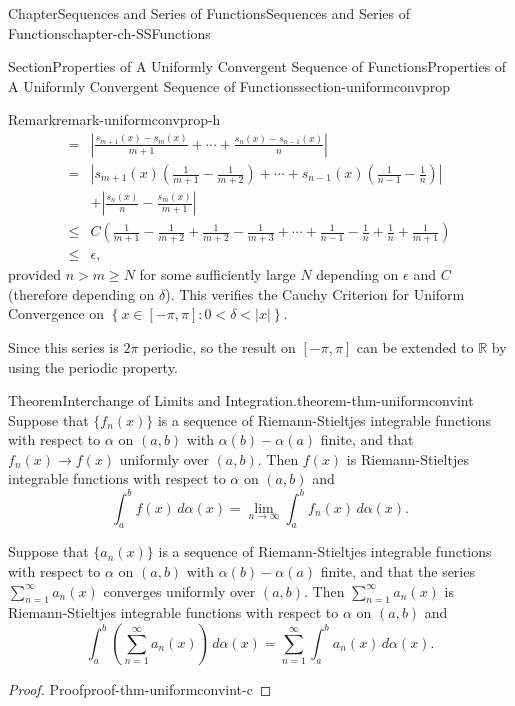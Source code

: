\documentclass[oneside,10pt,]{book}
\numberwithin{equation}{section}
\newcommand{\bbR}{\mathbb{R}}
\newcommand{\amp}{&}
\begin{document}
\begin{chapterptx}{Chapter}{Sequences and Series of Functions}{}{Sequences and Series of Functions}{}{}{chapter-ch-SSFunctions}
\begin{sectionptx}{Section}{Properties of A Uniformly Convergent Sequence of Functions}{}{Properties of A Uniformly Convergent Sequence of Functions}{}{}{section-uniformconvprop}
\begin{remark}{Remark}{}{remark-uniformconvprop-h}
\begin{align*}
=\amp \left| \frac{ s_{m+1}(x)-s_m(x)}{m+1}+ \cdots + \frac{ s_n(x)-s_{n-1}(x)}{n}\right| \\
=\amp \left| s_{m+1}(x)\left(\frac{1}{m+1}-\frac{1}{m+2}\right) 
+\cdots+ s_{n-1}(x)\left(\frac{1}{n-1}-\frac{1}{n}\right)\right| \\
\amp  + \left|\frac{s_n(x)}{n}-\frac{s_m(x)}{m+1}\right|\\
\le \amp C\left( \frac{1}{m+1}-\frac{1}{m+2} + \frac{1}{m+2}-\frac{1}{m+3} + \cdots +
\frac{1}{n-1}-\frac{1}{n} + \frac 1n +\frac {1}{m+1}\right)\\
\le \amp \epsilon\text{,}
\end{align*}
provided \(n > m\ge N\) for some sufficiently large \(N\) depending on \(\epsilon\) and \(C\) (therefore depending on \(\delta\)).  This verifies the Cauchy Criterion for Uniform Convergence on \(\left\{x\in [-\pi, \pi]: 0 < \delta < |x|\right\}\).%
\par
Since this series is \(2\pi\) periodic, so the result on \([-\pi, \pi]\) can be extended to \(\bbR\) by using the periodic property.%
\end{remark}
\begin{theorem}{Theorem}{Interchange of Limits and Integration.}{}{theorem-thm-uniformconvint}%
Suppose that \(\{f_n(x)\}\) is a sequence of Riemann-Stieltjes integrable functions with respect to \(\alpha\) on \((a, b)\) with \(\alpha(b)-\alpha(a)\) finite, and that \(f_n(x)\to f(x)\) uniformly over \((a, b)\). Then \(f(x)\) is Riemann-Stieltjes integrable functions with respect to \(\alpha\) on \((a, b)\) and%
\begin{equation}
\int_a^b f(x)\, d\alpha(x) =\lim_{n\to \infty} \int_a^b f_n(x)\, d\alpha(x).\label{men-limitint}
\end{equation}
%
\par
Suppose that  \(\{a_n(x)\}\) is a sequence of Riemann-Stieltjes integrable functions with respect to \(\alpha\) on \((a, b)\) with \(\alpha(b)-\alpha(a)\) finite, and that the series \(\sum_{n=1}^{\infty}a_n(x)\) converges uniformly over \((a,  b)\). Then \(\sum_{n=1}^{\infty}a_n(x)\) is Riemann-Stieltjes integrable functions with respect to \(\alpha\) on \((a, b)\) and%
\begin{equation*}
\int_a^b \left( \sum_{n=1}^{\infty}a_n(x) \right)\, d\alpha(x)= \sum_{n=1}^{\infty} \int_a^b a_n(x)\, d\alpha(x).
\end{equation*}
%
\end{theorem}
\begin{proof}{Proof}{}{proof-thm-uniformconvint-c}

\end{proof}
\end{sectionptx}
\end{chapterptx}
\end{document}
